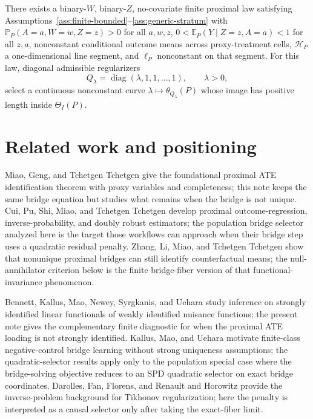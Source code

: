\documentclass[11pt]{article}
\newcommand{\E}{\mathbb{E}}
\renewcommand{\Pr}{\mathbb{P}}
\newcommand{\calH}{\mathcal{H}}
\theoremstyle{definition}
\theoremstyle{plain}
\theoremstyle{remark}
\begin{document}
\begin{conjecture}\label{conj:binary-witness}
There exists a binary-\(W\), binary-\(Z\), no-covariate finite proximal law
satisfying Assumptions~\ref{ass:finite-bounded}--\ref{ass:generic-stratum}
with \(\Pr_P(A=a,W=w,Z=z)>0\) for all \(a,w,z\),
\(0<\E_P(Y\mid Z=z,A=a)<1\) for all \(z,a\), nonconstant conditional outcome
means across proxy-treatment cells, \(\calH_P\) a one-dimensional line
segment, and \(\ell_P\) nonconstant on that segment.  For this law, diagonal
admissible regularizers
\[
Q_\lambda=\operatorname{diag}(\lambda,1,1,\ldots,1),\qquad \lambda>0,
\]
select a continuous nonconstant curve
\(\lambda\mapsto\theta_{Q_\lambda}(P)\) whose image has positive length
inside \(\Theta_I(P)\).
\end{conjecture}

\section{Related work and positioning}
Miao, Geng, and Tchetgen Tchetgen \cite{MiaoGengTchetgen2018Biometrika}
give the foundational proximal ATE identification theorem with proxy
variables and completeness; this note keeps the same bridge equation but
studies what remains when the bridge is not unique.  Cui, Pu, Shi, Miao, and
Tchetgen Tchetgen \cite{CuiPuShiMiaoTchetgen2024JASA} develop proximal
outcome-regression, inverse-probability, and doubly robust estimators; the
population bridge selector analyzed here is the target those workflows can
approach when their bridge step uses a quadratic residual penalty.  Zhang,
Li, Miao, and Tchetgen Tchetgen \cite{ZhangLiMiaoTchetgen2023SPL} show that
nonunique proximal bridges can still identify counterfactual means; the
null-annihilator criterion below is the finite bridge-fiber version of that
functional-invariance phenomenon.

Bennett, Kallus, Mao, Newey, Syrgkanis, and Uehara
\cite{BennettKallusMaoNeweySyrgkanisUehara2023COLT} study inference on
strongly identified linear functionals of weakly identified nuisance
functions; the present note gives the complementary finite diagnostic for
when the proximal ATE loading is not strongly identified.  Kallus, Mao, and
Uehara \cite{KallusMaoUehara2021MinimaxNC} motivate finite-class
negative-control bridge learning without strong uniqueness assumptions; the
quadratic-selector results apply only to the population special case where
the bridge-solving objective reduces to an SPD quadratic selector on exact
bridge coordinates.  Darolles, Fan, Florens, and Renault
\cite{DarollesFanFlorensRenault2011Econometrica} and Horowitz
\cite{Horowitz2014ARE} provide the inverse-problem background for Tikhonov
regularization; here the penalty is interpreted as a causal selector only
after taking the exact-fiber limit.
\end{document}

